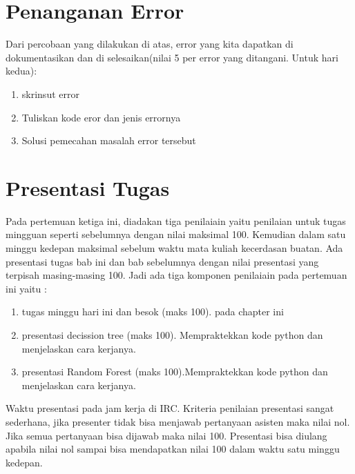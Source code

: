 \section{Penanganan Error}
Dari percobaan yang dilakukan di atas, error yang kita dapatkan di dokumentasikan dan di selesaikan(nilai 5 per error yang ditangani. Untuk hari kedua):

\begin{enumerate}
	\item skrinsut error
	\item Tuliskan kode eror dan jenis errornya
	\item Solusi pemecahan masalah error tersebut
\end{enumerate}

\section{Presentasi Tugas}
Pada pertemuan ketiga ini, diadakan tiga penilaiain yaitu penilaian untuk tugas mingguan seperti sebelumnya dengan nilai maksimal 100. Kemudian dalam satu minggu kedepan maksimal sebelum waktu mata kuliah kecerdasan buatan. Ada presentasi tugas bab ini dan bab sebelumnya dengan nilai presentasi yang terpisah masing-masing 100. Jadi ada tiga komponen penilaiain pada pertemuan ini yaitu :
\begin{enumerate}
	\item tugas minggu hari ini dan besok (maks 100). pada chapter ini
	\item presentasi decission tree (maks 100). Mempraktekkan kode python dan menjelaskan cara kerjanya.
	\item presentasi Random Forest (maks 100).Mempraktekkan kode python dan menjelaskan cara kerjanya.
\end{enumerate}
Waktu presentasi pada jam kerja di IRC. Kriteria penilaian presentasi sangat sederhana, jika presenter tidak bisa menjawab pertanyaan asisten maka nilai nol. Jika semua pertanyaan bisa dijawab maka nilai 100. Presentasi bisa diulang apabila nilai nol sampai bisa mendapatkan nilai 100 dalam waktu satu minggu kedepan.


